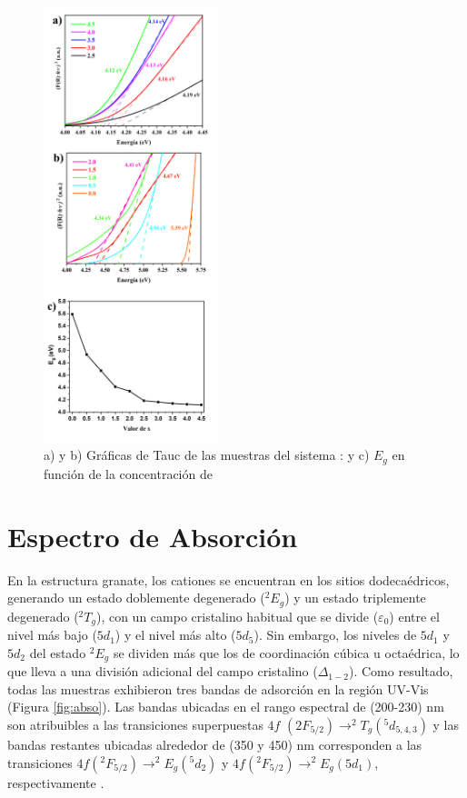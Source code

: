 \begin{figure}[H]
    \centering%

    \includegraphics[width=0.45\textwidth]{Kap4/Tauc2.png}%
    \caption{a) y b) Gráficas de Tauc de las muestras del sistema
    : y c) $E_g$ en función de la
    concentración de }\label{fig:tauc}
\end{figure}

\section{Espectro de Absorción}

En la estructura granate, los cationes  se encuentran en los sitios
dodecaédricos, generando un estado doblemente degenerado ($^{2}E_{g}$) y un
estado
triplemente degenerado ($^{2}T_{g}$), con un campo cristalino habitual que se
divide
($\varepsilon_{0}$) entre el nivel más bajo ($5d_{1}$) y el nivel más alto
($5d_5$). Sin embargo, los
niveles de $5d_1$ y $5d_2$ del estado $^2E_g$ se dividen más que los de
coordinación
cúbica u octaédrica, lo que lleva a una división adicional del campo cristalino
\cite{Dorenbos2003}
($\Delta_{1-2}$). Como resultado, todas las muestras exhibieron tres bandas de
adsorción en la región UV-Vis (Figura \ref{fig:abso}). Las bandas ubicadas en
el rango
espectral de (200-230) nm son atribuibles a las transiciones superpuestas $4f$
$(2F_{5/2}) \rightarrow ^2T_g(^5d_{5,4,3})$ y las bandas restantes ubicadas
alrededor de (350 y 450)
nm corresponden a las transiciones $4f(^2F_{5/2}) \rightarrow ^2E_g (^5d_2)$ y
    $4f(^2F_{5/2}) \rightarrow ^2E_g
    (5d_1)$, respectivamente \cite{Ueda2019}.\\

